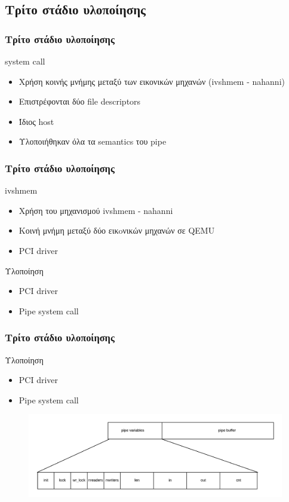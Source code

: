 \documentclass[red,slidestop,notes,compress,mathserif]{beamer}
\begin{document}
\subsection{Τρίτο στάδιο υλοποίησης}
\begin{frame}
\frametitle{Τρίτο στάδιο υλοποίησης}
\begin{block}{system call}
\begin{itemize}
\item Χρήση κοινής μνήμης μεταξύ των εικονικών μηχανών (ivshmem - nahanni)
\item Επιστρέφονται δύο file descriptors
\item Ίδιος host
\item Υλοποιήθηκαν όλα τα semantics του pipe 
\end{itemize}
\end{block}
\end{frame}

\begin{frame}
\frametitle{Τρίτο στάδιο υλοποίησης}
\begin{block}{ivshmem}
\begin{itemize}
\item Χρήση του μηχανισμού ivshmem - nahanni
\item Κοινή μνήμη μεταξύ δύο εικoνικών μηχανών σε QEMU
\item PCI driver 
\end{itemize}
\end{block}
\begin{block}{Υλοποίηση}
\begin{itemize}
\item PCI driver 
\item Pipe system call 
\end{itemize}
\end{block}
\end{frame}

\begin{frame}
\frametitle{Τρίτο στάδιο υλοποίησης}
\begin{block}{Υλοποίηση}
\begin{itemize}
\item PCI driver 
\item Pipe system call 
\end{itemize}
\end{block}
\begin{figure}
\center
\includegraphics[scale=0.66]{figures/shared_memoery_layout.png}
\end{figure}
\end{frame}
\end{document}
